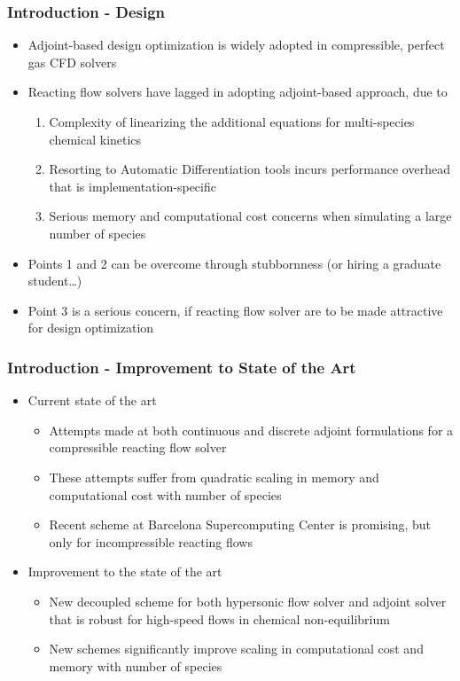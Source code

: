 \documentclass{beamer}
\begin{document}
\begin{frame}
  \frametitle{Introduction - Design}
  \begin{itemize}
    \item Adjoint-based design optimization is widely adopted in compressible,
      perfect gas CFD solvers
    \item Reacting flow solvers have lagged in adopting adjoint-based approach,
      due to
    \begin{enumerate}
      \item Complexity of linearizing the additional equations for
        multi-species chemical kinetics
      \item Resorting to Automatic Differentiation tools incurs performance
        overhead that is implementation-specific
      \item Serious memory and computational cost concerns when simulating a
        large number of species
    \end{enumerate}
    \item Points 1 and 2 can be overcome through stubbornness (or hiring a
      graduate student\dots)
    \item Point 3 is a serious concern, if reacting flow solver are to be made
      attractive for design optimization
  \end{itemize}
\end{frame}
\begin{frame}
  \frametitle{Introduction - Improvement to State of the Art}
  \begin{itemize}
    \item Current state of the art
      \begin{itemize}
        \item Attempts made at both continuous and
          discrete adjoint formulations
          for a compressible reacting flow solver
        \item These attempts suffer from quadratic scaling in memory and
          computational cost with number of species
        \item Recent scheme at Barcelona Supercomputing
          Center is promising, but only for
          incompressible reacting flows
      \end{itemize}
    \item Improvement to the state of the art
      \begin{itemize}
        \item New decoupled scheme for both hypersonic flow solver and adjoint
          solver that is robust for high-speed flows in chemical non-equilibrium
        \item New schemes significantly improve scaling in computational cost
          and memory with number of species
      \end{itemize}
  \end{itemize}
\end{frame}
\end{document}
